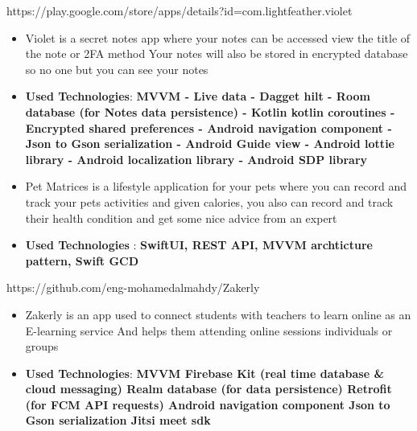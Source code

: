 \documentclass[10pt,a4paper,ragged2e,withhyper]{altacv}
\begin{document}
\begin{paracol}{1}
        {\cvrepo{\color{AndroidGreenColor}|\faGithub\faAndroid\faGooglePlay}
        {https://play.google.com/store/apps/details?id=com.lightfeather.violet}}{}{}
        \begin{itemize}
            \item Violet is a secret notes app where your notes can be accessed view the title of the note or 2FA method Your notes will also be stored in encrypted database so no one but you can see your notes
            \item \textbf{Used Technologies}: \textbf{MVVM -
            Live data -
            Dagget hilt -
            Room database (for Notes data persistence) -
            Kotlin kotlin coroutines -
            Encrypted shared preferences -
            Android navigation component -
            Json to Gson serialization -
            Android Guide view -
            Android lottie library -
            Android localization library -
            Android SDP library}
        \end{itemize}
        \divider


        {\cvrepo{\color{SwiftOrangeColor}|\faLock\faSwift}
        {}}{}{}
        \begin{itemize}
            \item \textbf{}Pet Matrices is a lifestyle application for your pets where you can record and track your pets activities and given calories, you also can record and track their health condition and get some nice advice from an expert
            \item \textbf{Used Technologies} : \textbf{SwiftUI, REST API, MVVM archticture pattern, Swift GCD}
        \end{itemize}
        \divider
        {\cvrepo{\color{AndroidGreenColor}|\faGithub\faAndroid}
        {https://github.com/eng-mohamedalmahdy/Zakerly}}{}{}
        \begin{itemize}
            \item \textbf{}Zakerly is an app used to connect students with teachers to learn online as an E-learning service And helps them attending online sessions individuals or groups
            \item \textbf{Used Technologies}: \textbf{MVVM
            Firebase Kit (real time database \& cloud messaging)
                Realm database (for data persistence)
                Retrofit (for FCM API requests)
                Android navigation component
                Json to Gson serialization
                Jitsi meet sdk}
        \end{itemize}
        \divider


\end{paracol}
\end{document}
